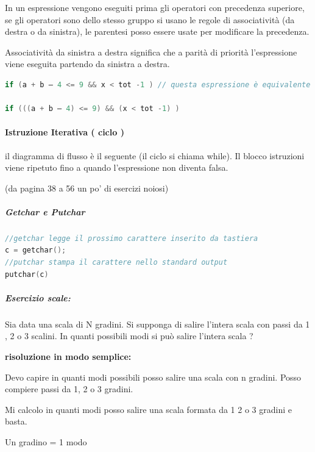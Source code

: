 \documentclass[
  paper=a4,
  oneside  ,captions=tableheading
]{scrbook}
\begin{document}
In un espressione vengono eseguiti prima gli operatori con precedenza
superiore, se gli operatori sono dello stesso gruppo si usano le regole
di associatività (da destra o da sinistra), le parentesi posso essere
usate per modificare la precedenza.

Associatività da sinistra a destra significa che a parità di priorità
l'espressione viene eseguita partendo da sinistra a destra.

\begin{lstlisting}[language={C++}]
if (a + b – 4 <= 9 && x < tot -1 ) // questa espressione è equivalente a quella sotto
    
if (((a + b – 4) <= 9) && (x < tot -1) )
\end{lstlisting}

\hypertarget{istruzione-iterativa-ciclo}{%
\paragraph{Istruzione Iterativa ( ciclo
)}\label{istruzione-iterativa-ciclo}}

il diagramma di flusso è il seguente (il ciclo si chiama while). Il
blocco istruzioni viene ripetuto fino a quando l'espressione non diventa
falsa.

(da pagina 38 a 56 un po' di esercizi noiosi)

\hypertarget{getchar-e-putchar}{%
\subparagraph{Getchar e Putchar}\label{getchar-e-putchar}}

\begin{lstlisting}[language={C++}]
//getchar legge il prossimo carattere inserito da tastiera
c = getchar();
//putchar stampa il carattere nello standard output
putchar(c)
\end{lstlisting}

\hypertarget{esercizio-scale}{%
\subparagraph{Esercizio scale:}\label{esercizio-scale}}

Sia data una scala di N gradini. Si supponga di salire l'intera scala
con passi da 1 , 2 o 3 scalini. In quanti possibili modi si può salire
l'intera scala ?

\textbf{risoluzione in modo semplice:}

Devo capire in quanti modi possibili posso salire una scala con n
gradini. Posso compiere passi da 1, 2 o 3 gradini.

Mi calcolo in quanti modi posso salire una scala formata da 1 2 o 3
gradini e basta.

Un gradino = 1 modo
\end{document}
